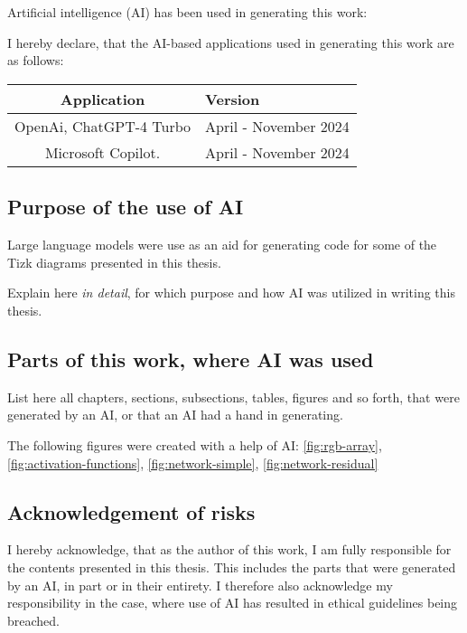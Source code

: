 \clearpage
\chapter*{\@aidisclaimertitle}
Artificial intelligence (AI) has been used in generating this work:


I hereby declare, that the AI-based applications used in generating this work are as follows:

\begin{center}
    \begin{tabular}{c|l}
        \toprule
        \textbf{Application} & \textbf{Version} \\
        \midrule
        OpenAi, ChatGPT-4 Turbo & April - November 2024 \\
        Microsoft Copilot. & April - November 2024 \\
        \bottomrule
    \end{tabular}
\end{center}

\section*{Purpose of the use of AI}

Large language models were use as an aid for generating code for some of the Tizk diagrams presented in this thesis.

Explain here \emph{in detail}, for which purpose and how AI was utilized in writing this thesis.

\section*{Parts of this work,  where AI was used}

List here all chapters, sections, subsections, tables, figures and so forth,
that were generated by an AI, or that an AI had a hand in generating.

The following figures were created with a help of AI: \ref{fig:rgb-array}, \ref{fig:activation-functions}, \ref{fig:network-simple}, \ref{fig:network-residual}

\section*{Acknowledgement of risks}

I hereby acknowledge, that as the author of this work, I am fully
responsible for the contents presented in this thesis. This includes
the parts that were generated by an AI, in part or in their entirety. I
therefore also acknowledge my responsibility in the case, where use of
AI has resulted in ethical guidelines being breached.

\clearpage
